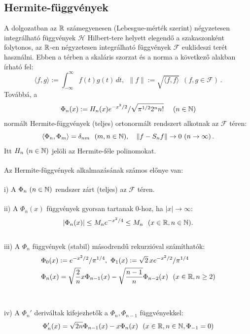 \documentclass[oneside,titlepage,12pt,a4paper]{report}
\begin{document}
\subsection{Hermite-függvények} \label{subsec::hermite}
A dolgozatban  az $\Bbb R$ számegyenesen (Lebesgue-mérték szerint) négyzetesen integrálható függvények $\mathcal H$ Hilbert-tere helyett elegendő a szakaszonként folytonos, az $\Bbb R$-en  négyzetesen integrálható függvények $\mathcal F$ euklideszi terét használni. Ebben a térben a skaláris szorzat és a norma a következő alakban írható fel:
\begin{equation}
 \langle f,g\rangle:=\int_{-\infty}^\infty f(t)g(t)\, dt,\ \ \|f\|:=\sqrt{\langle f,f\rangle}\ \ (f,g\in\mathcal F)\,.
\label{eq:dotprod}
\end{equation}
Továbbá, a
 \begin{equation*}
 \Phi_n(x):=H_n(x)e^{-x^2/2}/\sqrt{\pi^{1/2}2^n n!}\quad \ (n\in\Bbb N)
 \end{equation*}
normált Hermite-függvények (teljes) ortonormált rendszert alkotnak az $\mathcal F$ téren:
  \begin{equation*}
   \langle \Phi_n,\Phi_m\rangle=\delta_{nm}\ \ (m,n\in\Bbb N),\quad
  \|f-S_nf\|\to 0\ (n\to\infty)\,.
   \end{equation*}
Itt $H_n\ (n\in\Bbb N)$ jelöli az Hermite-féle polinomokat.
\\
\\
Az Hermite-függvények alkalmazásának számos előnye van: \\
\\
i) A $\Phi_n\ (n\in\Bbb N)$ rendszer zárt (teljes) az $\mathcal F$ téren. \\
\\
ii) A $\Phi_n(x)$ függvények gyorsan tartanak $0$-hoz, ha $|x|\to \infty$: \\
$$
|\Phi_n(x)|\le M_n e^{-x^2/4}\le M_n\ \ (x\in\Bbb R, n\in\Bbb N).
$$
\\
iii) A $\Phi_n$ függvények (stabil) másodrendű rekurzióval számíthatók: \\
\begin{equation}
\begin{split}
&\Phi_0(x):=e^{-x^2/2}/\pi^{1/4},\ \Phi_1(x):=\sqrt{2}\, x e^{-x^2/2}/\pi^{1/4}\\
&\Phi_n(x)=\sqrt{\frac 2 n} x \Phi_{n-1}(x)-\sqrt{\frac{n-1}n}\Phi_{n-2}(x)\ \ (x\in\Bbb R, n\ge 2)
\end{split}
\end{equation} 
\\
\\
iv) A $\Phi_n'$ deriváltak kifejezhetők a $\Phi_n, \Phi_{n-1} $ függvényekkel: \\
\begin{equation}
\Phi_n'(x)=\sqrt{2n}\Phi_{n-1}(x)-x\Phi_n(x)\ \ (x\in\Bbb R, n\in\Bbb N,\Phi_{-1}=0)
\end{equation}
\end{document}
